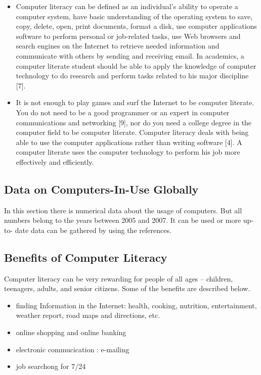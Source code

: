 \documentclass[]{article}
\begin{document}
\begin{itemize}
	\item Computer literacy can be defined as an individual’s ability
to operate a computer system, have basic understanding of
the operating system to save, copy, delete, open, print
documents, format a disk, use computer applications
software to perform personal or job-related tasks, use Web
browsers and search engines on the Internet to retrieve
needed information and communicate with others by
sending and receiving email. In academics, a computer
literate student should be able to apply the knowledge of
computer technology to do research and perform tasks
related to his major discipline [7].

	\item It is not enough to play games and surf the Internet to
be computer literate. You do not need to be a good
programmer or an expert in computer communications and
networking [9], nor do you need a college degree in the
computer field to be computer literate. Computer literacy
deals with being able to use the computer applications
rather than writing software [4]. A computer literate uses
the computer technology to perform his job more
effectively and efficiently.
\end{itemize}

\subsection{Data on Computers-In-Use Globally}
In this section there is numerical data about the usage of computers. But all numbers belong to the years between 2005 and 2007. It can be used or more up-to- date data can be gathered by using the references.
\subsection{Benefits of Computer Literacy}
Computer literacy can be very rewarding for people of
all ages – children, teenagers, adults, and senior citizens.
Some of the benefits are described below.
\begin{itemize}

\item finding Information in the Internet:
health, cooking,
nutrition, entertainment, weather report, road maps and
directions, etc.
\item  online shopping and online banking
\item electronic commucication : e-mailing
\item job searchong for 7/24

\end{itemize}
\end{document}
